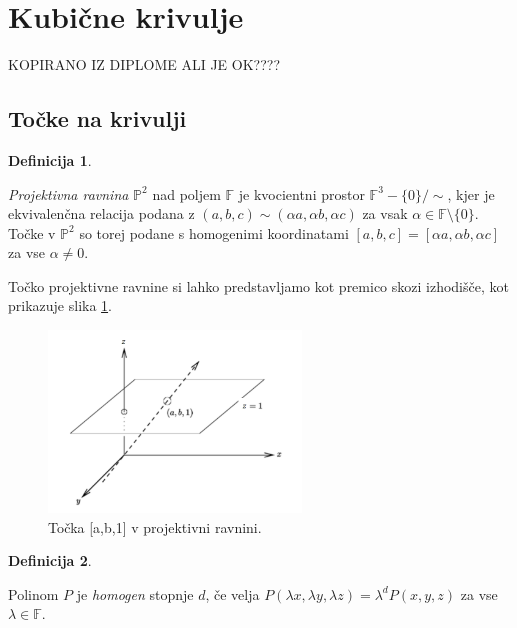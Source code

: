 \documentclass[12pt,a4paper,twoside]{article}
\theoremstyle{definition} %
\newtheorem{definicija}{Definicija}[section]
\theoremstyle{plain} %
\numberwithin{equation}{section}  %
\newcommand{\F}{\mathbb F}
\begin{document}
\section{Kubične krivulje}


KOPIRANO IZ DIPLOME ALI JE OK????

\subsection{Točke na krivulji}

\begin{definicija}~

\emph{Projektivna ravnina} $\mathbb{P}^2$ nad poljem $\F$ je kvocientni prostor $\F^3-\{0\}/\! \!\sim$, kjer je ekvivalenčna relacija podana z $(a,b,c)\sim(\alpha a,\alpha b,\alpha c)$ za vsak $\alpha \in \F \setminus \{0\}$. Točke v $\mathbb{P}^2$ so torej podane s homogenimi koordinatami $[a,b,c] = [\alpha a,\alpha b,\alpha c]$ za vse $\alpha \neq 0$.
\end{definicija} 

Točko projektivne ravnine si lahko predstavljamo kot premico skozi izhodišče, kot prikazuje slika \ref{fig:ravnina}.


\begin{figure}[h]
  \centering
  \includegraphics[width=0.6\textwidth]{images/ravnina.png}
  \caption[Primer točke v projektivni ravnini.]{Točka [a,b,1] v projektivni ravnini.}
  \label{fig:ravnina}
\end{figure}


\begin{definicija}~

Polinom $P$ je \emph{homogen} stopnje $d$, če velja $P(\lambda x,\lambda y, \lambda z) = \lambda ^d P(x,y,z)$ za vse $\lambda \in \F$.
\end{definicija}
\end{document}
